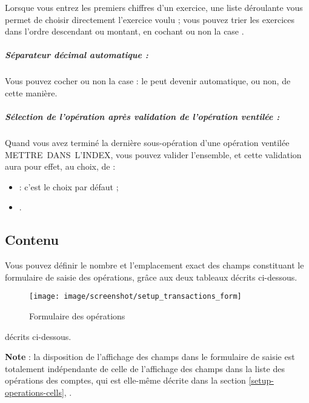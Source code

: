 Lorsque vous entrez les premiers chiffres d'un exercice, une liste déroulante vous permet de choisir directement l'exercice voulu ; vous pouvez trier les exercices dans l'ordre descendant ou montant, en cochant ou non la case .
	
\subparagraph{Séparateur décimal automatique :\label{setup-form-behaviour-decimal}}

Vous pouvez cocher ou non la case  : le  peut devenir automatique, ou non, de cette manière.


\subparagraph{Sélection de l'opération après validation de l'opération ventilée :\label{setup-form-behaviour-selection}}

Quand vous avez terminé la dernière sous-opération d'une opération ventilée METTRE DANS L'INDEX, vous pouvez valider l'ensemble, et cette validation aura pour effet, au choix, de :

\begin{itemize}
	\item {} : c'est le choix par défaut ;
	\item {}.
\end{itemize}




\subsection{Contenu\label{setup-form-content}}

Vous pouvez définir le nombre et l'emplacement exact des champs constituant le formulaire de saisie des opérations, grâce aux deux tableaux \ifIllustration décrits ci-dessous.
\begin{figure}[htbp]
\begin{center}
\texttt{[image: image/screenshot/setup\_transactions\_form]}
\end{center}
\caption{Formulaire des opérations}
\label{setup-transactions-form-img}
\end{figure}
\else décrits ci-dessous.
\fi

\textbf{Note} : la disposition de l'affichage des champs dans le formulaire de saisie est totalement indépendante de celle de  l'affichage des champs dans la liste des opérations des comptes, qui est elle-même décrite dans la section \vref{setup-operations-cells}, .


